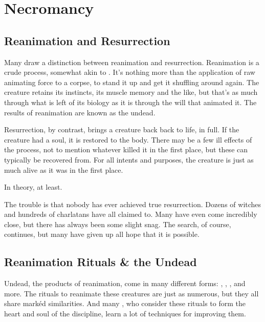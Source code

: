 \chapter{Necromancy}

\section{Reanimation and Resurrection}

Many  draw a distinction between reanimation and resurrection.
Reanimation is a crude process, somewhat akin to .
It's nothing more than the application of raw animating force to a corpse, to stand it up and get it shuffling around again.
The creature retains its instincts, its muscle memory and the like, but that's as much through what is left of its biology as it is through the will that animated it.
The results of reanimation are known as the undead.

Resurrection, by contrast, brings a creature back back to life, in full.
If the creature had a soul, it is restored to the body.
There may be a few ill effects of the process, not to mention whatever killed it in the first place, but these can typically be recovered from.
For all intents and purposes, the creature is just as much alive as it was in the first place.

In theory, at least.

The trouble is that nobody has ever achieved true resurrection.
Dozens of witches and hundreds of charlatans have all claimed to.
Many have even come incredibly close, but there has always been some slight snag.
The search, of course, continues, but many have given up all hope that it is possible.

\section{Reanimation Rituals \& the Undead}

Undead, the products of reanimation, come in many different forms: , , , and more.
The rituals to reanimate these creatures are just as numerous, but they all share mark{\'e}d similarities.
And many , who consider these rituals to form the heart and soul of the discipline, learn a lot of techniques for improving them.

